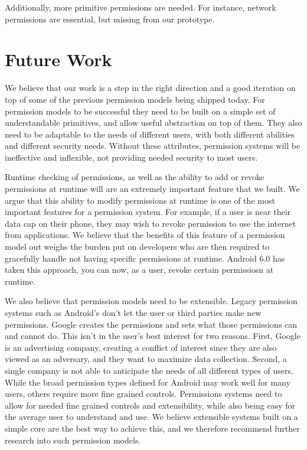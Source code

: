 Additionally, more primitive permissions are needed.  For instance, network permissions are essential, but missing from our prototype.

\section{Future Work}\label{section:futurework}
We believe that our work is a step in the right direction and a good iteration on top of some of the previous permission models being shipped today. 
For permission models to be successful they need to be built on a simple set of understandable primitives, and allow useful abstraction on top of them.
They also need to be adaptable to the needs of different users, with both different abilities and different security needs.
Without these attributes, permission systems will be ineffective and inflexible, not providing needed security to most users.

Runtime checking of permissions, as well as the ability to add or revoke permissions at runtime will are an extremely important feature that we built. We argue that this ability to modify permissions at runtime is one of the most important features for a permission system. For example, if a user is near their data cap on their phone, they may wish to revoke permission to use the internet from applications. We believe that the benefits of this feature of a permission model out weighs the burden put on developers who are then required to gracefully handle not having specific permissions at runtime. Android 6.0 has taken this approach, you can now, as a user, revoke certain permissiosn at runtime.

We also believe that permission models need to be extensible.
Legacy permission systems such as Android's don't let the user or third parties make new permissions. 
Google creates the permissions and sets what those permissions can and cannot do. 
This isn't in the user's best interest for two reasons. 
First, Google is an advertising company, creating a conflict of interest since they are also viewed as an adversary, and they want to maximize data collection.  
Second, a single company is not able to anticipate the needs of all different types of users.  While the broad permission types defined for Android may work well for many users, others require more fine grained controls.
Permissions systems need to allow for needed fine grained controls and extensibility, while also being easy for the average user to understand and use.
We believe extensible systems built on a simple core are the best way to achieve this, and we therefore recommend further research into such permission models.

